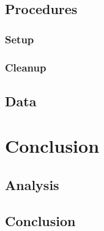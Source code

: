 \documentclass[12 pt]{report}
\begin{document}
\section{Procedures} \label{procedures}
\subsection{Setup} \label{procedures-setup}

\subsection{Cleanup} \label{procedures-cleanup}

\section{Data} \label{data}

\chapter{Conclusion} \label{conclusion-chapter}
\section{Analysis} \label{analysis}

\section{Conclusion} \label{conclusion-section}

\printbibliography[heading=subbibintoc]
\appendix
\end{document}
